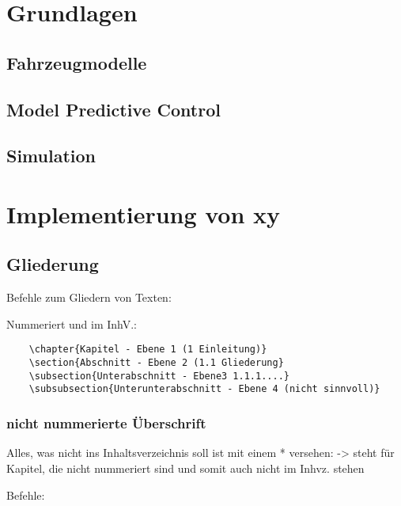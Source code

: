 \documentclass{like}
\begin{document}
\chapter{Grundlagen}

\section{Fahrzeugmodelle}
\section{Model Predictive Control}
\section{Simulation}




\chapter{Implementierung von xy} 
\section{Gliederung}
Befehle zum Gliedern von Texten:\par
Nummeriert und im InhV.:\nopagebreak\par\medskip\nopagebreak

\begin{minipage}{0.4\textwidth}
	\begin{verbatim}
	\chapter{Kapitel - Ebene 1 (1 Einleitung)}
	\section{Abschnitt - Ebene 2 (1.1 Gliederung}
	\subsection{Unterabschnitt - Ebene3 1.1.1....} 
	\subsubsection{Unterunterabschnitt - Ebene 4 (nicht sinnvoll)}
	\end{verbatim}
\end{minipage}


\subsection*{nicht nummerierte Überschrift}
Alles, was nicht ins Inhaltsverzeichnis soll ist mit einem *
versehen: -> steht für Kapitel, die nicht nummeriert sind und somit auch nicht im Inhvz. stehen\par
Befehle: \par
\end{document}
